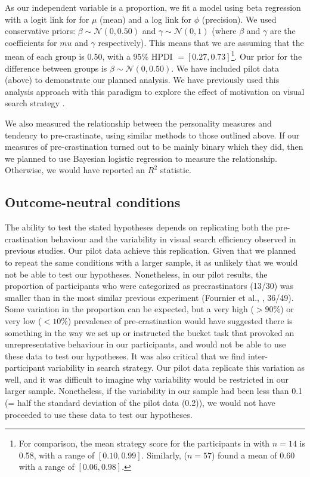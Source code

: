 \documentclass[]{rsos}
\begin{document}
As our independent variable is a proportion, we fit a model using beta regression \cite{ferrari2004beta} with a logit link for for $\mu$ (mean) and a log link for $\phi$ (precision). We used conservative priors: $\beta \sim\mathcal{N(0, 0.50)}$ and $\gamma \sim\mathcal{N}(0, 1)$ (where $\beta$ and $\gamma$ are the coefficients for $mu$ and $\gamma$ respectively). This means that we are assuming that the mean of each group is 0.50, with a $95\%$ HPDI $= [0.27, 0.73]$\footnote{For comparison, the mean strategy score for the participants in \cite{nowakowska2017} with $n=14$ is 0.58, with a range of $[0.10, 0.99]$. Similarly, \cite{clarke2019} ($n=57$) found a mean of 0.60 with a range of $[0.06, 0.98]$.}. Our prior for the difference between groups is $\beta \sim\mathcal{N}(0, 0.50)$. We have included pilot data (above) to demonstrate our planned analysis. We have previously used this analysis approach with this paradigm to explore the effect of motivation on visual search strategy \cite{james2019}.

We also measured the relationship between the personality measures and tendency to pre-crastinate, using similar methods to those outlined above. If our measures of pre-crastination turned out to be mainly binary which they did, then we planned to use Bayesian logistic regression to measure the relationship. Otherwise, we would have reported an $R^2$ statistic. 

\subsection{Outcome-neutral conditions} The ability to test the stated hypotheses depends on replicating both the pre-crastination behaviour and the variability in visual search efficiency observed in previous studies. Our pilot data achieve this replication. Given that we planned to repeat the same conditions with a larger sample, it as unlikely that we would not be able to test our hypotheses. Nonetheless, in our pilot results, the proportion of participants who were categorized as precrastinators (13/30) was smaller than in the most similar previous experiment (Fournier et al., \cite{fournier2019task}, 36/49). Some variation in the proportion can be expected, but a very high ($>90\%$) or very low ($<10\%$) prevalence of pre-crastination would have suggested there is something in the way we set up or instructed the bucket task that provoked an unrepresentative behaviour in our participants, and would not be able to use these data to test our hypotheses. It was also critical that we find inter-participant variability in search strategy. Our pilot data replicate this variation as well, and it was difficult to imagine why variability would be restricted in our larger sample. Nonetheless, if the variability in our sample had been less than 0.1 (= half the standard deviation of the pilot data (0.2)), we would not have proceeded to use these data to test our hypotheses. 
\end{document}
